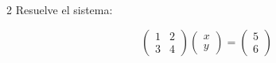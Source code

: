 \documentclass[11pt]{article}
\begin{document}
\begin{clproblem}{2}{}
Resuelve el sistema:

\[
\begin{pmatrix}1 & 2 \\ 3 & 4\end{pmatrix} \begin{pmatrix}x \\ y\end{pmatrix} = \begin{pmatrix}5 \\ 6\end{pmatrix}
\]
\end{clproblem}
\end{document}
